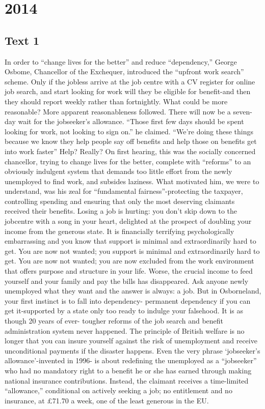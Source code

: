    
\section{2014}
\subsection{Text 1} 
In order to “change lives for the better” and reduce “dependency,” George Osbome, Chancellor of the Exchequer, introduced the “upfront work search” scheme. Only if the jobless arrive at the job centre with a CV register for online job search, and start looking for work will they be eligible for benefit-and then they should report weekly rather than fortnightly. What could be more reasonable?
More apparent reasonableness followed. There will now be a seven-day wait for the jobseeker’s allowance. “Those first few days should be spent looking for work, not looking to sign on.” he claimed. “We’re doing these things because we know they help people say off benefits and help those on benefits get into work faster” Help? Really? On first hearing, this was the socially concerned chancellor, trying to change lives for the better, complete with “reforms” to an obviously indulgent system that demands too little effort from the newly unemployed to find work, and subsides laziness. What motivated him, we were to understand, was his zeal for “fundamental fairness”-protecting the taxpayer, controlling spending and ensuring that only the most deserving claimants received their benefits.
Losing a job is hurting: you don’t skip down to the jobcentre with a song in your heart, delighted at the prospect of doubling your income from the generous state. It is financially terrifying psychologically embarrassing and you know that support is minimal and extraordinarily hard to get. You are now not wanted; you support is minimal and extraordinarily hard to get. You are now not wanted; you are now excluded from the work environment that offers purpose and structure in your life. Worse, the crucial income to feed yourself and your family and pay the bills has disappeared. Ask anyone newly unemployed what they want and the answer is always: a job. 
But in Osborneland, your first instinct is to fall into dependency- permanent dependency if you can get it-supported by a state only too ready to indulge your falsehood. It is as though 20 years of ever- tougher reforms of the job search and benefit administration system never happened. The principle of British welfare is no longer that you can insure yourself against the risk of unemployment and receive unconditional payments if the disaster happens. Even the very phrase ‘jobseeker’s allowance’-invented in 1996- is about redefining the unemployed as a “jobseeker” who had no mandatory right to a benefit he or she has earned through making national insurance contributions. Instead, the claimant receives a time-limited “allowance,” conditional on actively seeking a job; no entitlement and no insurance, at £71.70 a week, one of the least generous in the EU.

